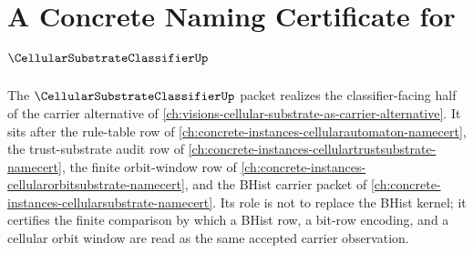 \chapter{A Concrete Naming Certificate for $\CellularSubstrateClassifierUp$}
\label{ch:concrete-instances-cellularsubstrateclassifier-namecert}

The $\CellularSubstrateClassifierUp$ packet realizes the classifier-facing half of the carrier alternative of \autoref{ch:visions-cellular-substrate-as-carrier-alternative}. It sits after the rule-table row of \autoref{ch:concrete-instances-cellularautomaton-namecert}, the trust-substrate audit row of \autoref{ch:concrete-instances-cellulartrustsubstrate-namecert}, the finite orbit-window row of \autoref{ch:concrete-instances-cellularorbitsubstrate-namecert}, and the BHist carrier packet of \autoref{ch:concrete-instances-cellularsubstrate-namecert}. Its role is not to replace the BHist kernel; it certifies the finite comparison by which a BHist row, a bit-row encoding, and a cellular orbit window are read as the same accepted carrier observation.



